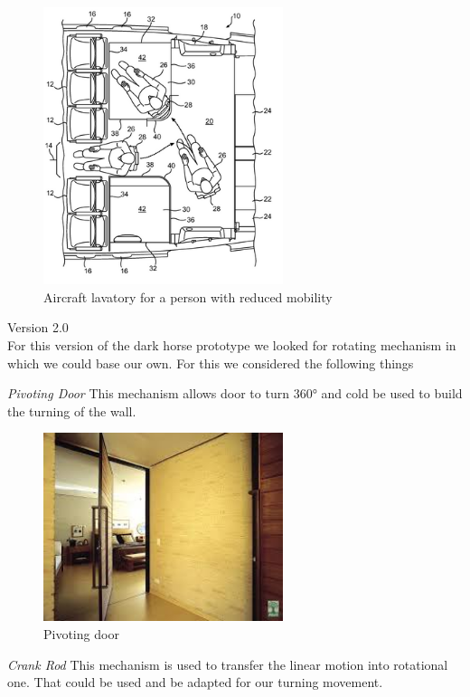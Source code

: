 \begin{figure}[h]
\centering
\includegraphics[width=7cm]{brazil_images/image017.png}
\caption{Aircraft lavatory for a person with reduced mobility}
\label{fig:aircraft_lavatory}
\end{figure}


Version 2.0 \\

For this version of the dark horse prototype we looked for rotating mechanism in which we could base our own. For this we considered the following things

\emph{Pivoting Door} This mechanism allows door to turn 360° and cold be used to build the turning of the wall.

\begin{figure}[h]
\centering
\includegraphics[width=7cm]{brazil_images/image018.jpg}
\caption{Pivoting door} %
\label{fig:pivoting_door}
\end{figure}


\emph{Crank Rod} This mechanism is used to transfer the linear motion into rotational one. That could be used and be adapted for our turning movement.

